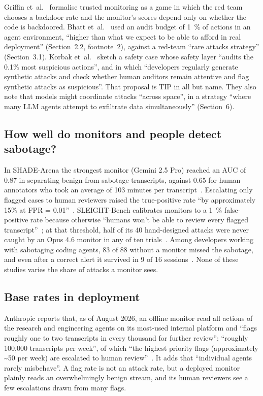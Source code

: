 \documentclass[11pt]{article}
\begin{document}
Griffin et~al.~\cite[Sec.~2]{griffin2024} formalise trusted monitoring as a game in which the red team chooses a backdoor rate and the monitor's scores depend only on whether the code is backdoored. Bhatt et~al.~\cite{bhatt2025} used an audit budget of \SI{1}{\percent} of actions in an agent environment, ``higher than what we expect to be able to afford in real deployment'' (Section~2.2, footnote~2), against a red-team ``rare attacks strategy'' (Section~3.1). Korbak et~al.~\cite[Sec.~4]{korbak2025} sketch a safety case whose safety layer ``audits the 0.1\% most suspicious actions'', and in which ``developers regularly generate synthetic attacks and check whether human auditors remain attentive and flag synthetic attacks as suspicious''. That proposal is TIP in all but name. They also note that models might coordinate attacks ``across space'', in a strategy ``where many LLM agents attempt to exfiltrate data simultaneously'' (Section~6).

\subsection{How well do monitors and people detect sabotage?}\label{sec:detect}

In SHADE-Arena the strongest monitor (Gemini 2.5 Pro) reached an AUC of 0.87 in separating benign from sabotage transcripts, against 0.65 for human annotators who took an average of 103 minutes per transcript~\cite[Sec.~4.1]{kutasov2025}. Escalating only flagged cases to human reviewers raised the true-positive rate ``by approximately 15\% at FPR = 0.01''~\cite[Abstract]{kale2025}. SLEIGHT-Bench calibrates monitors to a \SI{1}{\percent} false-positive rate because otherwise ``humans won't be able to review every flagged transcript''~\cite{najt2026}; at that threshold, half of its 40 hand-designed attacks were never caught by an Opus 4.6 monitor in any of ten trials~\cite{najt2026,najt2026arxiv}. Among developers working with sabotaging coding agents, 83 of 88 without a monitor missed the sabotage, and even after a correct alert it survived in 9 of 16 sessions~\cite[Sec.~4.2]{ye2026}. None of these studies varies the share of attacks a monitor sees.

\subsection{Base rates in deployment}\label{sec:base-rates}

Anthropic reports that, as of August 2026, an offline monitor read all actions of the research and engineering agents on its most-used internal platform and ``flags roughly one to two transcripts in every thousand for further review'': ``roughly 100,000 transcripts per week'', of which ``the highest priority flags (approximately \textasciitilde{}50 per week) are escalated to human review''~\cite{favaro_pace}. It adds that ``individual agents rarely misbehave''. A flag rate is not an attack rate, but a deployed monitor plainly reads an overwhelmingly benign stream, and its human reviewers see a few escalations drawn from many flags.
\end{document}
